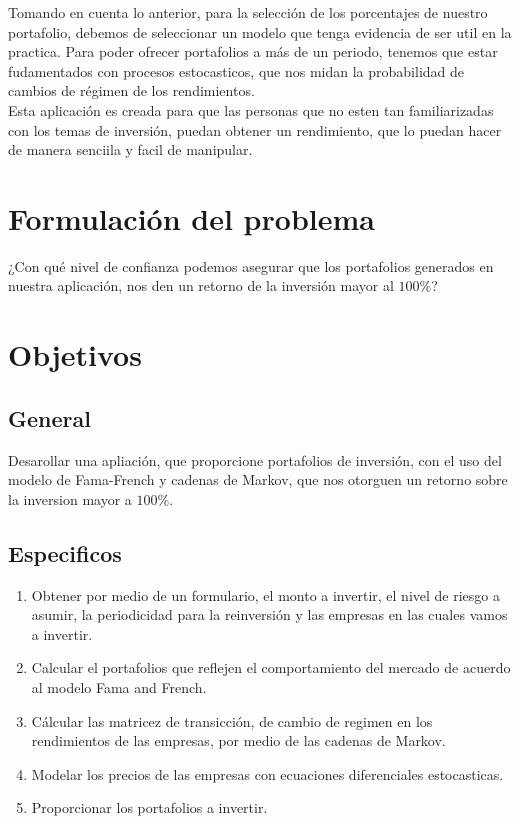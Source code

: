 \documentclass[12pt,a4paper]{article}
\begin{document}
	Tomando en cuenta lo anterior, para la selección de los porcentajes de nuestro portafolio, debemos de seleccionar un modelo que tenga evidencia de ser util en la practica. Para poder ofrecer portafolios a más de un periodo, tenemos que estar fudamentados con procesos estocasticos, que nos midan la probabilidad de cambios de régimen de los rendimientos.\\

	Esta aplicación es creada para que las personas que no esten tan familiarizadas con los temas de inversión,  puedan obtener un rendimiento, que lo puedan hacer de manera senciila y facil de manipular.\\
	
	\section{Formulación del problema}	
	¿Con qué nivel de confianza podemos asegurar que los portafolios generados en nuestra aplicación, nos den un retorno de la inversión mayor al
	 $100\%$?
	\section{Objetivos}
	\subsection{General}
			Desarollar una apliación, que proporcione portafolios de inversión, con el uso del modelo de Fama-French y cadenas de Markov, que nos otorguen un retorno sobre la  inversion mayor a $100\%$.
	\subsection{Especificos}
			\begin{enumerate}
			    \item Obtener por medio de un formulario, el monto a invertir, el nivel de riesgo a asumir, la periodicidad para la reinversión y las empresas en las cuales vamos a invertir.
			    \item Calcular el portafolios que reflejen el comportamiento del mercado de acuerdo al modelo Fama and French.
			    \item Cálcular las matricez de transicción, de cambio de regimen en los rendimientos de las empresas, por medio de las cadenas de Markov.
			    \item Modelar los precios de las empresas con ecuaciones diferenciales estocasticas.
			    \item Proporcionar los  portafolios a invertir.		
			 \end{enumerate}		
\end{document}
